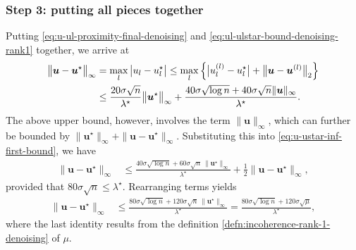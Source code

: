 \subsubsection{Step 3: putting all pieces together}


Putting \eqref{eq:u-ul-proximity-final-denoising} and \eqref{eq:ul-ulstar-bound-denoising-rank1} together, we arrive at
%
\begin{align}
\big\|\bm{u}-\bm{u}^{\star}\big\|_{\infty} & =\max_{l}\big|u_{l}-u_{l}^{\star}\big|\leq\max_{l}\Big\{\big|u_{l}^{(l)}-u_{l}^{\star}\big|+\big\|\bm{u}-\bm{u}^{(l)}\big\|_{2}\Big\} \notag\\
 & \leq \frac{20\sigma\sqrt{n}}{\lambda^{\star}} \big\|\bm{u}^{\star}\big\|_{\infty}
	+ \frac{40\sigma\sqrt{\log n}+40\sigma\sqrt{n}\|\bm{u}\|_{\infty}}{\lambda^{\star}}.
	\label{eq:u-ustar-inf-first-bound}
\end{align}
%
The above upper bound, however, involves the term $\|\bm{u}\|_{\infty}$, which can further be bounded by
$\|\bm{u}^{\star}\|_{\infty} + \|\bm{u}-\bm{u}^{\star} \|_{\infty}$.  Substituting this into \eqref{eq:u-ustar-inf-first-bound}, we have
\begin{align*}
\big\|\bm{u}-\bm{u}^{\star}\big\|_{\infty}
	& \leq \frac{40\sigma\sqrt{\log n} + 60 \sigma \sqrt{n}\, \|\bm{u}^{\star}\|_{\infty} }{\lambda^{\star}}+\frac{1}{2}\big\|\bm{u}-\bm{u}^{\star}\big\|_{\infty},
\end{align*}
%
provided that $80\sigma\sqrt{n}\leq\lambda^{\star}$. Rearranging terms yields
\begin{align*}
	 \big\|\bm{u}-\bm{u}^{\star}\big\|_{\infty}
	 &\leq \frac{ 80\sigma\sqrt{\log n} + 120 \sigma \sqrt{n}\, \|\bm{u}^{\star}\|_{\infty} }{\lambda^{\star}}
	 = \frac{80\sigma\sqrt{\log n} + 120 \sigma \sqrt{\mu} }{\lambda^{\star}} ,
\end{align*}
%
where the last identity results from the definition \eqref{defn:incoherence-rank-1-denoising} of $\mu$.

%




